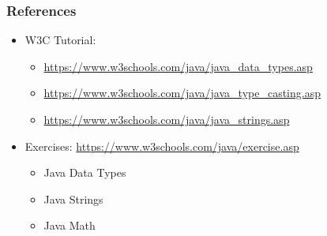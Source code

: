 \documentclass{beamer}
\begin{document}
	\begin{frame}
		\frametitle{References}
		\begin{itemize}
			\item W3C Tutorial: 
			\begin{itemize}
				\item \url{https://www.w3schools.com/java/java\_data\_types.asp}
				\item \url{https://www.w3schools.com/java/java\_type\_casting.asp}
				\item \url{https://www.w3schools.com/java/java\_strings.asp}
			\end{itemize}
			\item Exercises: \url{https://www.w3schools.com/java/exercise.asp}
			\begin{itemize}
				\item Java Data Types
				\item Java Strings
				\item Java Math
			\end{itemize}
		\end{itemize}
	\end{frame}
\end{document}
